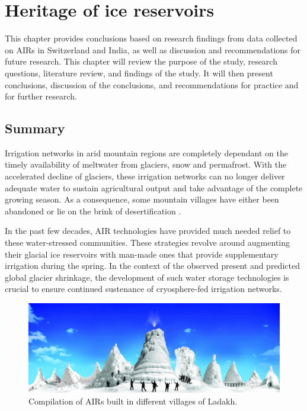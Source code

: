 \chapter{Heritage of ice reservoirs}


This chapter provides conclusions based on research findings from data collected on AIRs in Switzerland and India,
as well as discussion and recommendations for future research. This chapter will review the purpose of the
study, research questions, literature review, and findings of the study. It will then present conclusions,
discussion of the conclusions, and recommendations for practice and for further research.

\section{Summary}

Irrigation networks in arid mountain regions are completely dependant on the timely availability of meltwater
from glaciers, snow and permafrost. With the accelerated decline of glaciers, these irrigation networks can no
longer deliver adequate water to sustain agricultural output and take advantage of the complete growing season.
As a consequence, some mountain villages have either been abandoned or lie on the brink of desertification
\citep{grossmanHimalayanGlaciersMelt2015}.

In the past few decades, AIR technologies have provided much needed relief to these
water-stressed communities. These strategies revolve around augmenting their glacial ice reservoirs with
man-made ones that provide supplementary irrigation during the spring. In the context of the observed present
and predicted global glacier shrinkage, the development of such water storage technologies is crucial to ensure
continued sustenance of cryosphere-fed irrigation networks.

\begin{figure}[htb]
	\includegraphics[width=\textwidth]{figs/AIRs_Ladakh}
	\caption{Compilation of AIRs built in different villages of Ladakh.}
	\label{fig:airs_ladakh}
\end{figure}

